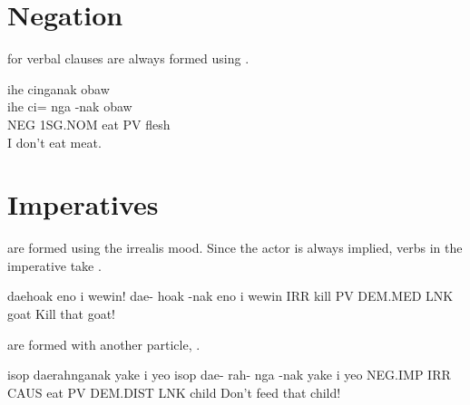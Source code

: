 \section{Negation}
 for verbal clauses are always formed using .
\begin{examples}
	\ex
	\label{ex:dont_eat_meat}
	\script ihe cinganak obaw \\
	\bits ihe ci= nga -nak obaw \\
	\gloss NEG 1SG.NOM eat PV flesh \\
	\tr I don't eat meat.
\end{examples}

\section{Imperatives}
 are formed using the irrealis mood. Since the
actor is always implied, verbs in the imperative take \PV.
\begin{examples}
	\ex
	\label{ex:go_kill_goat}
	\script daehoak eno i wewin!
	\bits dae- hoak -nak eno i wewin
	\gloss IRR kill PV DEM.MED LNK goat
	\tr Kill that goat!
\end{examples}

 are formed with another particle, .
\begin{examples}
	\ex
	\label{ex:dont_feed_that_child}
	\script isop daerahnganak yake i yeo
	\bits isop dae- rah- nga -nak yake i yeo
	\gloss NEG.IMP IRR CAUS eat PV DEM.DIST LNK child
	\tr Don't feed that child!
\end{examples}



